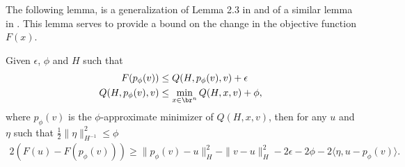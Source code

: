 \documentclass[11pt]{article}
\numberwithin{equation}{section}
\begin{document}
The following lemma,  is a  generalization of Lemma 2.3 in \cite{Beck2009} and of a similar lemma in \cite{Schmidtetal}.
This lemma serves to provide a bound on the change in the objective function $F(x)$. 
\begin{lemma}
    \label{lem:subp_inexact}
    Given $\epsilon$, $\phi$ and $H$ such that
    \begin{align}
        \label{lem:BT2.3-assump-g}
        F(p_{\phi}(v)) &\leq Q(H, p_{\phi}(v),v) +\epsilon \\
        Q(H, p_{\phi}(v),v) &\leq \min_{x\in\br^n} Q(H,  x,v) + \phi, \nonumber
    \end{align}
    where $p_{\phi}(v)$ is the $\phi$-approximate minimizer of $Q(H, x,v)$, then for any $u$ and $\eta$ such that $\frac{1}{2} \| \eta \|^2_{H^{-1}} \leq \phi$
    \begin{align}
        2(F(u) - F(p_{\phi}( v))) \geq \|p_{\phi}( v)-u\|_H^2 - \|v-u\|_H^2-2\epsilon-2\phi-2 \langle \eta, u - p_{\phi}(v) \rangle. \nonumber
    \end{align}
\end{lemma}

\vskip5mm
\end{document}
